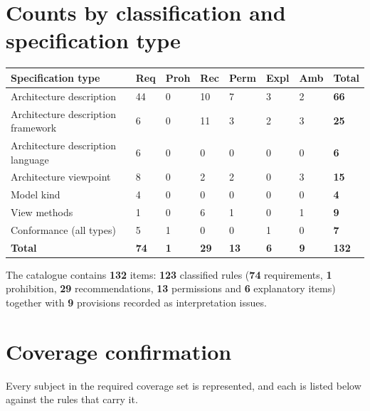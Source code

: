 \documentclass[11pt,a4paper]{report}
\begin{document}
\section{Counts by classification and specification type}

\begin{center}
\small
\begin{tabular}{@{}L{46mm} C{11mm} C{11mm} C{11mm} C{11mm} C{11mm} C{11mm} C{12mm}@{}}
\toprule
\textbf{Specification type} & \textbf{Req} & \textbf{Proh} & \textbf{Rec} &
\textbf{Perm} & \textbf{Expl} & \textbf{Amb} & \textbf{Total} \\
\midrule
Architecture description & 44 & 0 & 10 & 7 & 3 & 2 & \textbf{66} \\
Architecture description framework & 6 & 0 & 11 & 3 & 2 & 3 & \textbf{25} \\
Architecture description language & 6 & 0 & 0 & 0 & 0 & 0 & \textbf{6} \\
Architecture viewpoint & 8 & 0 & 2 & 2 & 0 & 3 & \textbf{15} \\
Model kind & 4 & 0 & 0 & 0 & 0 & 0 & \textbf{4} \\
View methods & 1 & 0 & 6 & 1 & 0 & 1 & \textbf{9} \\
Conformance (all types) & 5 & 1 & 0 & 0 & 1 & 0 & \textbf{7} \\
\midrule
\textbf{Total} & \textbf{74} & \textbf{1} & \textbf{29} & \textbf{13} & \textbf{6} & \textbf{9} & \textbf{132} \\
\bottomrule
\end{tabular}
\end{center}

The catalogue contains \textbf{132} items: \textbf{123} classified rules
(\textbf{74} requirements, \textbf{1} prohibition, \textbf{29} recommendations,
\textbf{13} permissions and \textbf{6} explanatory items) together with
\textbf{9} provisions recorded as interpretation issues.

\section{Coverage confirmation}

Every subject in the required coverage set is represented, and each is listed
below against the rules that carry it.
\end{document}
